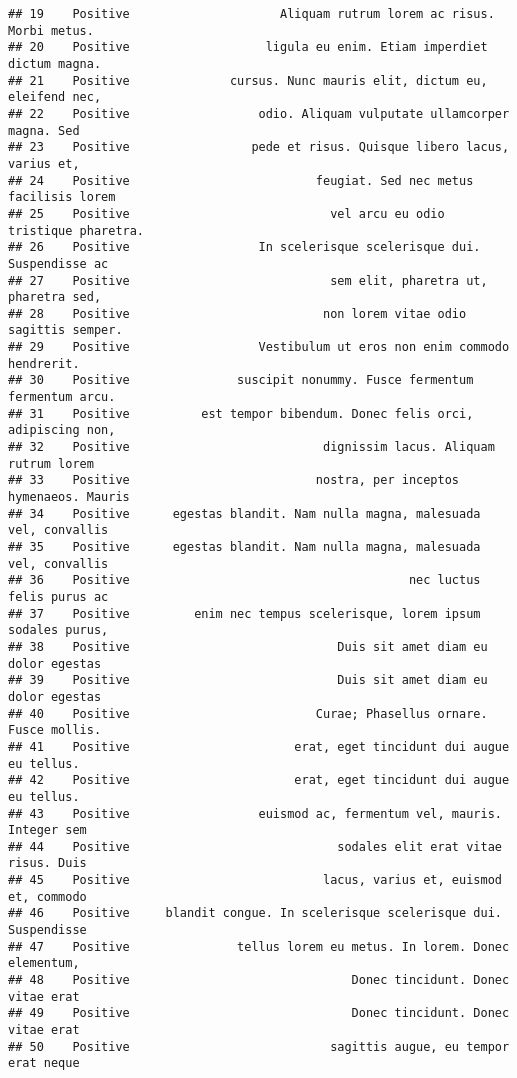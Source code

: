 \documentclass[
]{article}
\begin{document}
\begin{verbatim}
## 19    Positive                     Aliquam rutrum lorem ac risus. Morbi metus.
## 20    Positive                   ligula eu enim. Etiam imperdiet dictum magna.
## 21    Positive              cursus. Nunc mauris elit, dictum eu, eleifend nec,
## 22    Positive                  odio. Aliquam vulputate ullamcorper magna. Sed
## 23    Positive                 pede et risus. Quisque libero lacus, varius et,
## 24    Positive                          feugiat. Sed nec metus facilisis lorem
## 25    Positive                            vel arcu eu odio tristique pharetra.
## 26    Positive                  In scelerisque scelerisque dui. Suspendisse ac
## 27    Positive                            sem elit, pharetra ut, pharetra sed,
## 28    Positive                           non lorem vitae odio sagittis semper.
## 29    Positive                  Vestibulum ut eros non enim commodo hendrerit.
## 30    Positive               suscipit nonummy. Fusce fermentum fermentum arcu.
## 31    Positive          est tempor bibendum. Donec felis orci, adipiscing non,
## 32    Positive                           dignissim lacus. Aliquam rutrum lorem
## 33    Positive                          nostra, per inceptos hymenaeos. Mauris
## 34    Positive      egestas blandit. Nam nulla magna, malesuada vel, convallis
## 35    Positive      egestas blandit. Nam nulla magna, malesuada vel, convallis
## 36    Positive                                       nec luctus felis purus ac
## 37    Positive         enim nec tempus scelerisque, lorem ipsum sodales purus,
## 38    Positive                             Duis sit amet diam eu dolor egestas
## 39    Positive                             Duis sit amet diam eu dolor egestas
## 40    Positive                          Curae; Phasellus ornare. Fusce mollis.
## 41    Positive                       erat, eget tincidunt dui augue eu tellus.
## 42    Positive                       erat, eget tincidunt dui augue eu tellus.
## 43    Positive                  euismod ac, fermentum vel, mauris. Integer sem
## 44    Positive                             sodales elit erat vitae risus. Duis
## 45    Positive                           lacus, varius et, euismod et, commodo
## 46    Positive     blandit congue. In scelerisque scelerisque dui. Suspendisse
## 47    Positive               tellus lorem eu metus. In lorem. Donec elementum,
## 48    Positive                               Donec tincidunt. Donec vitae erat
## 49    Positive                               Donec tincidunt. Donec vitae erat
## 50    Positive                            sagittis augue, eu tempor erat neque

\end{verbatim}
\end{document}
